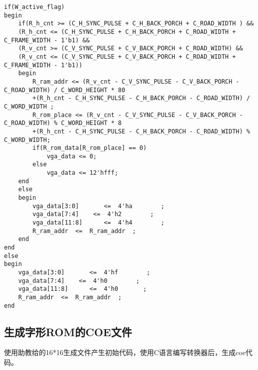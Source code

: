 \documentclass[lang=cn,11pt,a4paper]{elegantpaper}
\begin{document}
\begin{lstlisting}
if(W_active_flag)     
begin
    if(R_h_cnt >= (C_H_SYNC_PULSE + C_H_BACK_PORCH + C_ROAD_WIDTH ) && 
    (R_h_cnt <= (C_H_SYNC_PULSE + C_H_BACK_PORCH + C_ROAD_WIDTH + C_FRAME_WIDTH - 1'b1) &&
    (R_v_cnt >= (C_V_SYNC_PULSE + C_V_BACK_PORCH + C_ROAD_WIDTH) && 
    (R_v_cnt <= (C_V_SYNC_PULSE + C_V_BACK_PORCH + C_ROAD_WIDTH + C_FRAME_WIDTH - 1'b1))
    begin
        R_ram_addr <= (R_v_cnt - C_V_SYNC_PULSE - C_V_BACK_PORCH - C_ROAD_WIDTH) / C_WORD_HEIGHT * 80
        +(R_h_cnt - C_H_SYNC_PULSE - C_H_BACK_PORCH - C_ROAD_WIDTH) / C_WORD_WIDTH ;
        R_rom_place <= (R_v_cnt - C_V_SYNC_PULSE - C_V_BACK_PORCH - C_ROAD_WIDTH) % C_WORD_HEIGHT * 8
        +(R_h_cnt - C_H_SYNC_PULSE - C_H_BACK_PORCH - C_ROAD_WIDTH) % C_WORD_WIDTH;
        if(R_rom_data[R_rom_place] == 0)
            vga_data <= 0;
        else
            vga_data <= 12'hfff; 
    end
    else
    begin
        vga_data[3:0]       <=  4'ha        ;
        vga_data[7:4]    <=  4'h2        ;
        vga_data[11:8]      <=  4'h4        ;
        R_ram_addr  <=  R_ram_addr  ;
    end                          
end
else
begin
    vga_data[3:0]       <=  4'hf        ;
    vga_data[7:4]    <=  4'h0        ;
    vga_data[11:8]      <=  4'h0       ;
    R_ram_addr  <=  R_ram_addr  ;
end
\end{lstlisting}

\subsection{生成字形ROM的COE文件}

使用助教给的16*16生成文件产生初始代码，使用C语言编写转换器后，生成coe代码。
\end{document}
